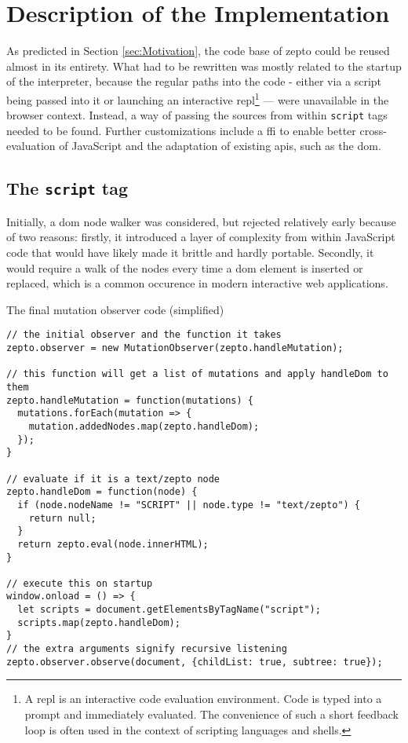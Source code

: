 \documentclass[oneside,11pt,xetex]{scrbook}
\begin{document}
\section{Description of the Implementation}

As predicted in Section \ref{sec:Motivation}, the code base of zepto could be reused almost in its entirety.
What had to be rewritten was mostly related to the startup of the interpreter, because the regular
paths into the code - either via a script being passed into it or launching an interactive
\gls{repl}\footnote{A \gls{repl} is an interactive code evaluation environment. Code is typed into
a prompt and immediately evaluated. The convenience of such a short feedback loop is often used
in the context of scripting languages and shells.} --- were unavailable in the browser context.
Instead, a way of passing the sources from within \texttt{script} tags needed to be found. Further
customizations include a \gls{ffi} to enable better cross-evaluation of JavaScript and the adaptation
of existing \gls{api}s, such as the \gls{dom}.

\subsection{The \texttt{script} tag}
\label{sec:MutObs}

Initially, a \gls{dom} node walker was considered, but rejected relatively early because of two reasons:
firstly, it introduced a layer of complexity from within JavaScript code that would have likely made
it brittle and hardly portable. Secondly, it would require a walk of the nodes every time a \gls{dom}
element is inserted or replaced, which is a common occurence in modern interactive web applications.

\begin{listing}[H]
\caption{The final mutation observer code (simplified)}
\begin{verbatim}
// the initial observer and the function it takes
zepto.observer = new MutationObserver(zepto.handleMutation);

// this function will get a list of mutations and apply handleDom to them
zepto.handleMutation = function(mutations) {
  mutations.forEach(mutation => {
    mutation.addedNodes.map(zepto.handleDom);
  });
}

// evaluate if it is a text/zepto node
zepto.handleDom = function(node) {
  if (node.nodeName != "SCRIPT" || node.type != "text/zepto") {
    return null;
  }
  return zepto.eval(node.innerHTML);
}

// execute this on startup
window.onload = () => {
  let scripts = document.getElementsByTagName("script");
  scripts.map(zepto.handleDom);
}
// the extra arguments signify recursive listening
zepto.observer.observe(document, {childList: true, subtree: true});
\end{verbatim}
\label{fig:mutobs}
\end{listing}
\end{document}
